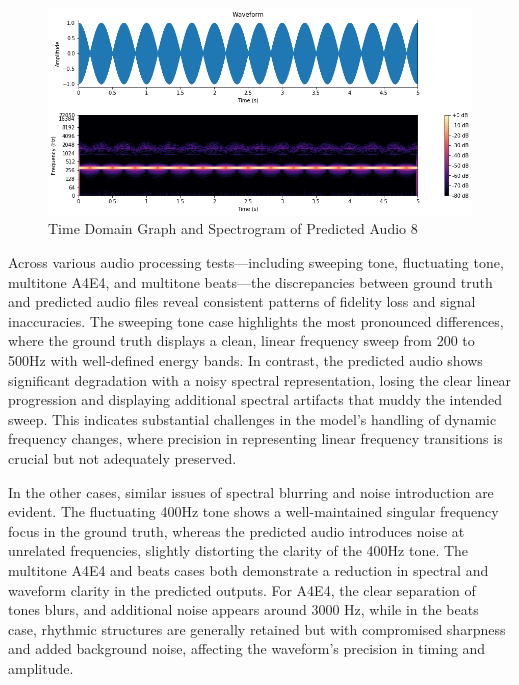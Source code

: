 \documentclass{ioereport}
\begin{document}
    \begin{figure}[H]
        \centering
        \includegraphics[width=\linewidth]{assets/audio_results/multitoneBeatspred.png}
        \caption{Time Domain Graph and Spectrogram of Predicted Audio 8}
        \label{fig:pred-multibeat-spec}
    \end{figure}

Across various audio processing tests—including sweeping tone, fluctuating tone, multitone A4E4, and multitone beats—the discrepancies between ground truth and predicted audio files reveal consistent patterns of fidelity loss and signal inaccuracies. The sweeping tone case highlights the most pronounced differences, where the ground truth displays a clean, linear frequency sweep from 200 to 500Hz with well-defined energy bands. In contrast, the predicted audio shows significant degradation with a noisy spectral representation, losing the clear linear progression and displaying additional spectral artifacts that muddy the intended sweep. This indicates substantial challenges in the model's handling of dynamic frequency changes, where precision in representing linear frequency transitions is crucial but not adequately preserved.

In the other cases, similar issues of spectral blurring and noise introduction are evident. The fluctuating 400Hz tone shows a well-maintained singular frequency focus in the ground truth, whereas the predicted audio introduces noise at unrelated frequencies, slightly distorting the clarity of the 400Hz tone. The multitone A4E4 and beats cases both demonstrate a reduction in spectral and waveform clarity in the predicted outputs. For A4E4, the clear separation of tones blurs, and additional noise appears around 3000 Hz, while in the beats case, rhythmic structures are generally retained but with compromised sharpness and added background noise, affecting the waveform’s precision in timing and amplitude.
\end{document}
